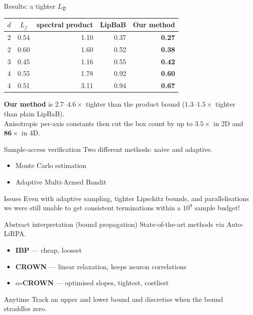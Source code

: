 \documentclass{beamer}
\newcommand{\drift}{\mathfrak{D}}          %
\begin{document}
\begin{frame}{Results: a tighter $L_\drift$}
  \begin{table}
    \centering\small
    \begin{tabular}{cc rrr}
      \toprule
      $d$ & $L_f$ & spectral product & LipBaB & Our method \\
      \midrule
      2 & 0.54 & 1.10 & 0.37 & \textbf{0.27} \\
      2 & 0.60 & 1.60 & 0.52 & \textbf{0.38} \\
      3 & 0.45 & 1.16 & 0.55 & \textbf{0.42} \\
      4 & 0.55 & 1.78 & 0.92 & \textbf{0.60} \\
      4 & 0.51 & 3.11 & 0.94 & \textbf{0.67} \\
      \bottomrule
    \end{tabular}
  \end{table}
  \centering\small
  \textbf{Our method} is $2.7$--$4.6\times$ tighter than the product bound
  ($1.3$--$1.5\times$ tighter than plain LipBaB).\\[1mm]
  Anisotropic per-axis constants then cut the box count by up to $\mathbf{3.5\times}$ in 2D and
  $\mathbf{86\times}$ in 4D.
\end{frame}



\begin{frame}{Sample-access verification}
  Two different methods: naive and adaptive.
  \begin{itemize}
    \item Monte Carlo estimation
    \item Adaptive Multi-Armed Bandit
  \end{itemize}

  \alert{Issues}
  Even with adaptive sampling, tighter Lipschitz bounds, and parallelisations we were still unable to get consistent terminations within a $10^9$ sample budget!
\end{frame}





\begin{frame}{Abstract interpretation (bound propagation)}
  State-of-the-art methods via Auto-LiRPA.
  \begin{itemize}
    \item \textbf{IBP} --- cheap, loosest
    \item \textbf{CROWN} --- linear relaxation, keeps neuron correlations
    \item \textbf{$\alpha$-CROWN} --- optimised slopes, tightest, costliest
  \end{itemize}
  \begin{exampleblock}{Anytime}\centering
    Track an upper and lower bound and discretise when the bound straddles zero.
  \end{exampleblock}
\end{frame}
\end{document}
